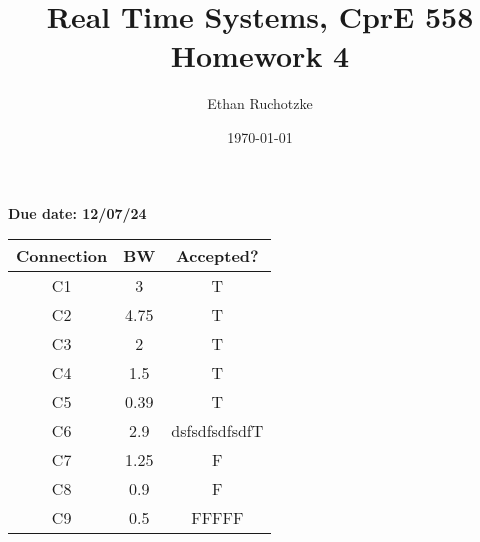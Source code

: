 \documentclass{elsarticle} %
\begin{document}
\title{Real Time Systems, CprE 558\\ Homework 4}

\author{Ethan Ruchotzke}

\date{\today}

\maketitle

{\bf Due date: 12/07/24}

\begin{table}[htbp]
    \centering
    \begin{tabular}{|c|c|c|}
        \hline
        Connection & BW & Accepted? \\
        \hline
        C1 & 3 & T \\
        C2 & 4.75 & T \\
        C3 & 2 & T \\
        C4 & 1.5 & T \\
        C5 & 0.39 & T \\
        C6 & 2.9 & dsfsdfsdfsdfT \\
        C7 & 1.25 & F \\
        C8 & 0.9 & F \\
        C9 & 0.5 & FFFFF \\
        \hline
    \end{tabular}
\end{table}
\end{document}
